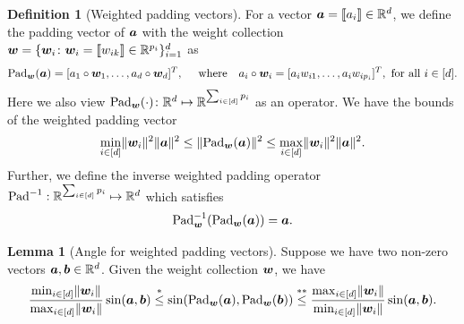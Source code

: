 \documentclass[lettersize,onecolumn,journal]{IEEEtran}
\theoremstyle{definition}
\newtheorem{lem}{Lemma}
\theoremstyle{definition}
\newtheorem{defn}{Definition}
\begin{document}
\begin{defn}[Weighted padding vectors]\label{def:pad} For a vector $\bm{a} = \llbracket a_i \rrbracket \in \mathbb{R}^d$, we define the padding vector of $\bm{a}$ with the weight collection $\bm{w} = \{\bm{w}_i\colon \bm{w}_i = \llbracket w_{ik} \rrbracket \in \mathbb{R}^{p_i}\}_{i = 1}^d$ as
\begin{equation}\label{eq:paddef}
    \pad_{\mw}(\ma) = [a_1 \circ \mw_1, \ldots, a_d \circ \mw_d]^T, \quad \text{ where} \quad  a_i \circ \mw_i = [a_i w_{i1},\ldots, a_i w_{i p_i}]^T, \text{ for all } i \in [d].
\end{equation}
Here we also view $\text{Pad}_{\bm{w}}(\cdot)\colon \mathbb{R}^{d}\mapsto \mathbb{R}^{\sum_{i\in[d]}p_i}$ as an operator. 
We have the bounds of the weighted padding vector
\begin{equation}\label{eq:pad_bound}
     \min_{i \in [d]} \onormSize{}{\mw_i}^2 \onormSize{}{\ma}^2 \leq \onormSize{}{\pad_{\mw}(\ma)}^2 \leq \max_{i \in [d]} \onormSize{}{\mw_i}^2 \onormSize{}{\ma}^2.
\end{equation}
Further, we define the inverse weighted padding operator $\text{Pad}^{-1}: \mathbb{R}^{\sum_{i\in[d]}p_i}\mapsto \mathbb{R}^d$ which satisfies 
\begin{equation}
    \text{Pad}^{-1}_{\bm{w}}(\text{Pad}_{\bm{w}}(\bm{a})) = \bm{a}.
\end{equation}
\end{defn}

\begin{lem}[Angle for weighted padding vectors]\label{lem:pad} Suppose we have two non-zero vectors $\bm{a}, \bm{b} \in \mathbb{R}^d$. Given the weight collection $\bm{w}$, we have 
\begin{equation}\label{eq:lempad}
   \frac{\min_{i \in [d]} \onormSize{}{\mw_i}}{\max_{i \in [d]} \onormSize{}{\mw_i} } \sin (\ma, \mb) \stackrel{*}{\leq} \sin(\pad_{\mw}(\ma),  \pad_{\mw}(\mb)) \stackrel{**}{\leq} \frac{ \max_{i \in [d]} \onormSize{}{\mw_i} }{\min_{i \in [d]} \onormSize{}{\mw_i}} \sin (\ma, \mb).
\end{equation}
\end{lem}
\end{document}
